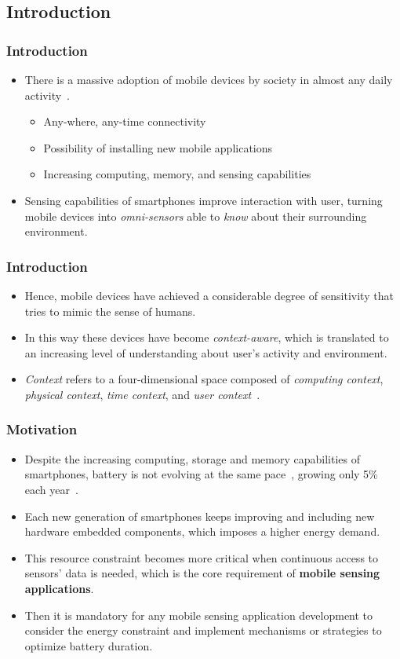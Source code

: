 \documentclass[compress,9pt,xcolor={dvipsnames,table}]{beamer}
\begin{document}
\subsection{Introduction}
\begin{frame}\frametitle{Introduction}
\begin{itemize}
	\item There is a massive adoption of mobile devices by society in almost any daily activity~\cite{Islam2014}.
	\begin{itemize}
		\item Any-where, any-time connectivity
		\item Possibility of installing new mobile applications
		\item Increasing computing, memory, and sensing capabilities
	\end{itemize}
	\item Sensing capabilities of smartphones improve interaction with user, turning mobile devices into \emph{omni-sensors} able to \emph{know} about their surrounding environment.
\end{itemize}
\end{frame}

\begin{frame}\frametitle{Introduction}
\begin{itemize}
	\item Hence, mobile devices have achieved a considerable degree of sensitivity that tries to mimic the sense of humans.
	\item In this way these devices have become \emph{context-aware}, which is translated to an increasing level of understanding about user's activity and environment.
  \item \emph{Context} refers to a four-dimensional space composed of \emph{computing context}, \emph{physical context}, \emph{time context}, and \emph{user context}~\cite{Chen2000}.
\end{itemize}
\end{frame}


\begin{frame}\frametitle{Motivation}
\begin{itemize}
	\item Despite the increasing computing, storage and memory capabilities of smartphones, battery is not evolving at the same pace~\cite{Kjaergaard2012}, growing only 5\% each year~\cite{Ma2012}.
	\item Each new generation of smartphones keeps improving and including new hardware embedded components, which imposes a higher energy demand.
	\item This resource constraint becomes more critical when continuous access to sensors' data is needed, which is the core requirement of \textbf{mobile sensing applications}.
  \item Then it is mandatory for any mobile sensing application development to consider the energy constraint and implement mechanisms or strategies to optimize battery duration.
\end{itemize}
\end{frame}
\end{document}
